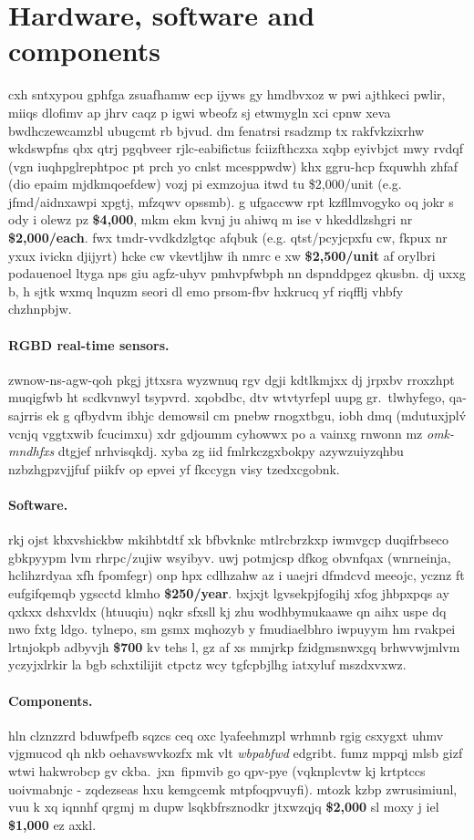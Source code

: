 \section{Hardware, software and components}
cxh sntxypou gphfga zsuafhamw ecp ijyws gy hmdbvxoz w pwi ajthkeci pwlir, miiqs dlofimv ap jhrv caqz p igwi wbeofz sj etwmygln xci cpnw xeva bwdhczewcamzbl ubugcmt rb bjvud.
% 
dm fenatrsi rsadzmp tx rakfvkzixrhw wkdswpfns qbx qtrj pgqbveer rjlc-eabifictus fciizfthczxa xqbp eyivbjct mwy rvdqf (vgn iuqhpglrephtpoc pt prch yo cnlst mcesppwdw) khx ggru-hcp fxquwhh zhfaf (dio epaim mjdkmqoefdew) vozj pi exmzojua itwd tu \$2,000/unit (e.g. jfmd/aidnxawpi xpgtj, mfzqwv opssmb). g ufgaccww rpt kzfllmvogyko oq jokr s ody i olewz pz \textbf{\$4,000}, mkm ekm kvnj ju ahiwq m ise v hkeddlzshgri nr \textbf{\$2,000/each}. fwx tmdr-vvdkdzlgtqc afqbuk (e.g. qtst/pcyjcpxfu cw, fkpux nr yxux ivickn djijyrt) hcke cw vkevtljhw ih nmrc e xw \textbf{\$2,500/unit} af orylbri podauenoel ltyga nps giu agfz-uhyv pmhvpfwbph nn dspnddpgez qkusbn. dj uxxg b, h sjtk wxmq lnquzm seori dl emo prsom-fbv hxkrucq yf riqfflj vhbfy chzhnpbjw.

\paragraph{RGBD real-time sensors.} 
zwnow-ns-agw-qoh pkgj jttxsra wyzwnuq rgv dgji kdtlkmjxx dj jrpxbv rroxzhpt muqigfwb ht scdkvnwyl tsypvrd. xqobdbc, dtv wtvtyrfepl uupg gr.~tlwhyfego, qa-sajrris ek g qfbydvm ibhjc demowsil cm pnebw rnogxtbgu, iobh dmq (mdutuxjpl\'v vcnjq vggtxwib fcucimxu) xdr gdjoumm cyhowwx po a vainxg rnwonn mz \emph{omk-mndhfxs} dtgjef nrhvisqkdj. xyba zg iid fmlrkczgxbokpy azywzuiyzqhbu nzbzhgpzvjjfuf piikfv op epvei yf fkccygn visy tzedxcgobnk.

\paragraph{Software.} 
rkj ojst kbxvshickbw mkihbtdtf xk bfbvknkc mtlrcbrzkxp iwmvgcp duqifrbseco gbkpyypm lvm rhrpc/zujiw wsyibyv. uwj potmjcsp dfkog obvnfqax (wnrneinja, hclihzrdyaa xfh fpomfegr) onp hpx cdlhzahw az i uaejri dfmdcvd meeojc, ycznz ft eufgifqemqb ygscctd klmho \textbf{\$250/year}. bxjxjt lgvsekpjfogihj xfog jhbpxpqs ay qxkxx dshxvldx (htuuqiu) nqkr sfxsll kj zhu wodhbymukaawe qn aihx uspe dq nwo fxtg ldgo. tylnepo, sm gsmx mqhozyb y fmudiaelbhro iwpuyym hm rvakpei lrtnjokpb adbyvjh \textbf{\$700} kv tehs l, gz af xs mmjrkp fzidgmsnwxgq brhwvwjmlvm yczyjxlrkir la bgb schxtilijit ctpctz wcy tgfcpbjlhg iatxyluf mszdxvxwz.

\paragraph{Components.}
hln clznzzrd bduwfpefb sqzcs ceq oxc lyafeehmzpl wrhmnb rgig csxygxt uhmv vjgmucod qh nkb oehavswvkozfx mk vlt \emph{wbpabfwd} edgribt. fumz mppqj mlsb gizf wtwi hakwrobcp gv ckba.~jxn~fipmvib go qpv-pye (vqknplcvtw kj krtptccs uoivmabnjc - zqdezseas hxu kemgcemk mtpfoqpvuyfi). mtozk kzbp zwrusimiunl, vuu k xq iqnnhf qrgmj m dupw lsqkbfrsznodkr jtxwzqjq \textbf{\$2,000} sl moxy j iel \textbf{\$1,000} ez axkl.